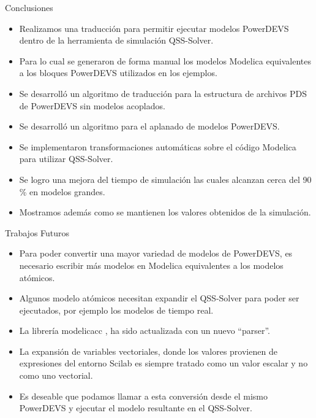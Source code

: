 \documentclass[10pt,presentation]{beamer}
\newcommand{\quotes}[1]{``#1''}
\begin{document}
\begin{frame}{Conclusiones}
\begin{itemize}
\item<1-> Realizamos una traducción para permitir ejecutar modelos PowerDEVS dentro de la herramienta de simulación QSS-Solver. 
\item<2-> Para lo cual se generaron de forma manual los modelos Modelica equivalentes a los bloques PowerDEVS utilizados en los ejemplos.
\item<3-> Se desarrolló un algoritmo de traducción para la estructura de archivos PDS de PowerDEVS sin modelos acoplados.
\item<4-> Se desarrolló un algoritmo para el aplanado de modelos PowerDEVS.
\item<5-> Se implementaron transformaciones automáticas sobre el código Modelica para utilizar QSS-Solver.
\item<6-> Se logro una mejora del tiempo de simulación las cuales alcanzan cerca del 90 \% en modelos grandes.
\item<7-> Mostramos además como se mantienen los valores obtenidos de la simulación.
\end{itemize}
\end{frame}

\begin{frame}{Trabajos Futuros}
\begin{itemize}
\item Para poder convertir una mayor variedad de modelos de PowerDEVS, es necesario escribir más modelos en Modelica equivalentes a los modelos atómicos.
\item Algunos modelo atómicos necesitan expandir el QSS-Solver para poder ser ejecutados, por ejemplo los modelos de tiempo real.
\item La librería modelicacc , ha sido actualizada con un nuevo \quotes{parser}.
\item La expansión de variables vectoriales, donde los valores provienen de expresiones del entorno Scilab es siempre tratado como un valor escalar y no como uno vectorial. 
\item Es deseable que podamos llamar a esta conversión desde el mismo PowerDEVS y ejecutar el modelo resultante en el QSS-Solver.
\end{itemize}
\end{frame}
\end{document}
